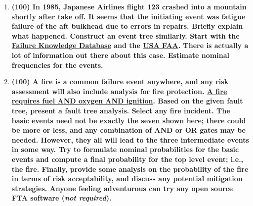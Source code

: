 \documentclass[11pt,a4paper]{article}
\begin{document}
\begin{enumerate}[leftmargin=*,topsep=0pt,font=\bfseries]
        \newpage
    \item\textbf{(100) In 1985, Japanese Airlines flight 123 crashed into a mountain shortly after take off. It seems that the initiating event was fatigue failure of the aft bulkhead due to errors in repairs. Briefly explain what happened. Construct an event tree similarly. Start with the \href{http://www.shippai.org/fkd/en/cfen/CB1071008.html}{Failure Knowledge Database} and the \href{https://lessonslearned.faa.gov/ll_adsearch_results.cfm?TabID=5}{USA FAA}. There is actually a lot of information out there about this case. Estimate nominal frequencies for the events.}
        \vspace{\baselineskip}
        
        
        
        
        
        
        
        
        
        
        
        
        
        
        
        
        
        
        
        
        
        
        
        
        
        
        
        
        
        
        
        
        
        
        
        \newpage
    \item\textbf{(100) A fire is a common failure event anywhere, and any risk assessment will also include analysis for fire protection. \href{https://images.sampletemplates.com/wp-content/uploads/2016/06/02114906/Fault-Tree-Analysis-Format.jpg}{A fire requires fuel AND oxygen AND ignition}. Based on the given fault tree, present a fault tree analysis. Select any fire incident. The basic events need not be exactly the seven shown here; there could be more or less, and any combination of AND or OR gates may be needed. However, they all will lead to the three intermediate events in some way. Try to formulate nominal probabilities for the basic events and compute a final probability for the top level event; i.e., the fire. Finally, provide some analysis on the probability of the fire in terms of risk acceptability, and discuss any potential mitigation strategies. Anyone feeling adventurous can try any open source FTA software (\textit{not required}).}
        \vspace{\baselineskip}
        

\end{enumerate}
\end{document}
